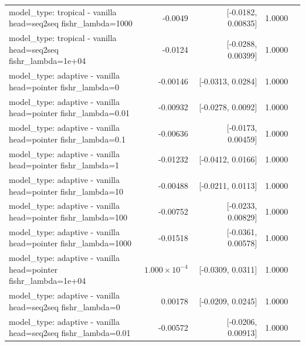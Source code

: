 \documentclass[10pt]{article}
\makeatletter
\newcommand{\stackcell}[1]{\begin{tabular}[t]{@{}l@{}}#1\end{tabular}}
\makeatother
\begin{document}
{\begin{longtable}{lrrrl}
\stackcell{model\_type: tropical - vanilla\\\footnotesize head=seq2seq fishr\_lambda=1000 } & -0.0049 & [-0.0182, 0.00835] & 1.0000 & \\
\stackcell{model\_type: tropical - vanilla\\\footnotesize head=seq2seq fishr\_lambda=1e+04 } & -0.0124 & [-0.0288, 0.00399] & 1.0000 & \\
\stackcell{model\_type: adaptive - vanilla\\\footnotesize head=pointer fishr\_lambda=0 } & -0.00146 & [-0.0313, 0.0284] & 1.0000 & \\
\stackcell{model\_type: adaptive - vanilla\\\footnotesize head=pointer fishr\_lambda=0.01 } & -0.00932 & [-0.0278, 0.0092] & 1.0000 & \\
\stackcell{model\_type: adaptive - vanilla\\\footnotesize head=pointer fishr\_lambda=0.1 } & -0.00636 & [-0.0173, 0.00459] & 1.0000 & \\
\stackcell{model\_type: adaptive - vanilla\\\footnotesize head=pointer fishr\_lambda=1 } & -0.01232 & [-0.0412, 0.0166] & 1.0000 & \\
\stackcell{model\_type: adaptive - vanilla\\\footnotesize head=pointer fishr\_lambda=10 } & -0.00488 & [-0.0211, 0.0113] & 1.0000 & \\
\stackcell{model\_type: adaptive - vanilla\\\footnotesize head=pointer fishr\_lambda=100 } & -0.00752 & [-0.0233, 0.00829] & 1.0000 & \\
\stackcell{model\_type: adaptive - vanilla\\\footnotesize head=pointer fishr\_lambda=1000 } & -0.01518 & [-0.0361, 0.00578] & 1.0000 & \\
\stackcell{model\_type: adaptive - vanilla\\\footnotesize head=pointer fishr\_lambda=1e+04 } & $1.000\times10^{-4}$ & [-0.0309, 0.0311] & 1.0000 & \\
\stackcell{model\_type: adaptive - vanilla\\\footnotesize head=seq2seq fishr\_lambda=0 } & 0.00178 & [-0.0209, 0.0245] & 1.0000 & \\
\stackcell{model\_type: adaptive - vanilla\\\footnotesize head=seq2seq fishr\_lambda=0.01 } & -0.00572 & [-0.0206, 0.00913] & 1.0000 & \\

\end{longtable}}
\end{document}

